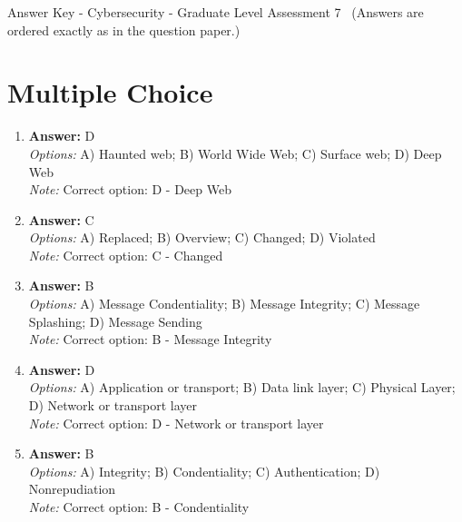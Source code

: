 \documentclass[12pt]{article}
\begin{document}
\begin{center}
Answer Key - Cybersecurity - Graduate Level Assessment 7 \
\small (Answers are ordered exactly as in the question paper.)
\end{center}

\section*{Multiple Choice}
\begin{enumerate}[label=\arabic*.]
\item \textbf{Answer:} D
\\ \textit{Options:} A) Haunted web; B) World Wide Web; C) Surface web; D) Deep Web
\\ \textit{Note:} Correct option: D - Deep Web
\item \textbf{Answer:} C
\\ \textit{Options:} A) Replaced; B) Overview; C) Changed; D) Violated
\\ \textit{Note:} Correct option: C - Changed
\item \textbf{Answer:} B
\\ \textit{Options:} A) Message Condentiality; B) Message Integrity; C) Message Splashing; D) Message Sending
\\ \textit{Note:} Correct option: B - Message Integrity
\item \textbf{Answer:} D
\\ \textit{Options:} A) Application or transport; B) Data link layer; C) Physical Layer; D) Network or transport layer
\\ \textit{Note:} Correct option: D - Network or transport layer
\item \textbf{Answer:} B
\\ \textit{Options:} A) Integrity; B) Condentiality; C) Authentication; D) Nonrepudiation
\\ \textit{Note:} Correct option: B - Condentiality
\end{enumerate}
\end{document}
